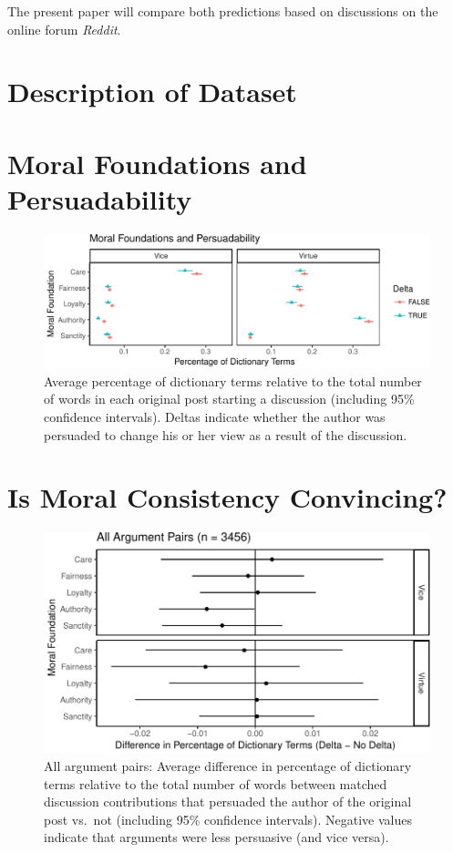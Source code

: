 \documentclass[12pt,]{article}
\begin{document}
The present paper will compare both predictions based on discussions on
the online forum \emph{Reddit}.

\section{Description of Dataset}\label{description-of-dataset}

\section{Moral Foundations and
Persuadability}\label{moral-foundations-and-persuadability}

\begin{figure}
\centering
\includegraphics{prelim_files/figure-latex/examine op data-1.pdf}
\caption{Average percentage of dictionary terms relative to the total
number of words in each original post starting a discussion (including
95\% confidence intervals). Deltas indicate whether the author was
persuaded to change his or her view as a result of the discussion.}
\end{figure}

\section{Is Moral Consistency
Convincing?}\label{is-moral-consistency-convincing}

\begin{figure}
\centering
\includegraphics{prelim_files/figure-latex/check all discussion pairs-1.pdf}
\caption{All argument pairs: Average difference in percentage of
dictionary terms relative to the total number of words between matched
discussion contributions that persuaded the author of the original post
vs.~not (including 95\% confidence intervals). Negative values indicate
that arguments were less persuasive (and vice versa).}
\end{figure}
\end{document}
